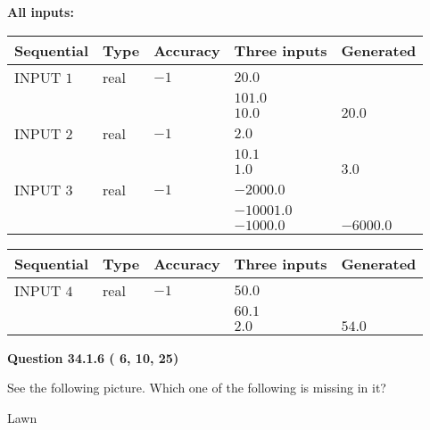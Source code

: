 \documentclass[12pt]{article}
\begin{document}
   
   
   
\noindent\vspace{0.1in}\hspace{-0.08in} {\textbf{\Large{All inputs: }}}
   
   
  
  
\noindent\begin{tabular}{|l|l|l|l|l|}
\hline
 Sequential & Type & Accuracy & Three inputs & Generated \\ 
\hline
 
 
  INPUT $           1$ & real & $          -1 $ & $
 20.0
  $ & \\
  & & &  $
 101.0
  $ & \\
  & & &  $
 10.0
 $ & $ 20.0 $ 
 \\  \hline  
 
 
  INPUT $           2$ & real & $          -1 $ & $
 2.0
  $ & \\
  & & &  $
 10.1
  $ & \\
  & & &  $
 1.0
 $ & $ 3.0 $ 
 \\  \hline  
 
 
  INPUT $           3$ & real & $          -1 $ & $
 -2000.0
  $ & \\
  & & &  $
 -10001.0
  $ & \\
  & & &  $
 -1000.0
 $ & $ -6000.0 $ 
 \\  \hline  
 \end{tabular}
   
   
  
  
\noindent\begin{tabular}{|l|l|l|l|l|}
\hline
 Sequential & Type & Accuracy & Three inputs & Generated \\ 
\hline
 
 
  INPUT $           4$ & real & $          -1 $ & $
 50.0
  $ & \\
  & & &  $
 60.1
  $ & \\
  & & &  $
 2.0
 $ & $ 54.0 $ 
 \\  \hline  
 \end{tabular}
   
   
  
\vspace{0.2in}
  
{\textbf{\Large{Question
34.1.6 
 (          6,         10,         25)
}}}
  
  
See the following picture.
Which one of the following is missing in it?
 
 
Lawn
 
\end{document}
